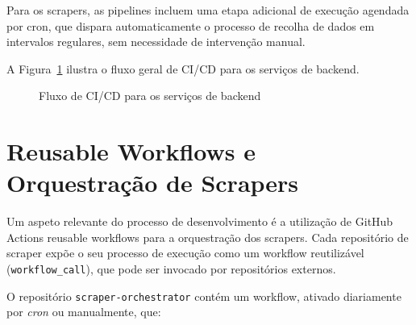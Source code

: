 Para os scrapers, as pipelines incluem uma etapa adicional de execução agendada por cron, que dispara automaticamente o processo de recolha de dados em intervalos regulares, sem necessidade de intervenção manual.

A Figura~\ref{fig:cicd} ilustra o fluxo geral de \ac{CI/CD} para os serviços de backend.

\begin{figure}[H]
\centering
{}
\caption{Fluxo de \ac{CI/CD} para os serviços de backend}
\label{fig:cicd}
\end{figure}

\section{Reusable Workflows e Orquestração de Scrapers}
\label{sec:5.4}

Um aspeto relevante do processo de desenvolvimento é a utilização de GitHub Actions reusable workflows para a orquestração dos scrapers. Cada repositório de scraper expõe o seu processo de execução como um workflow reutilizável (\texttt{workflow\_call}), que pode ser invocado por repositórios externos.

O repositório \texttt{scraper-orchestrator} contém um workflow, ativado diariamente por \textit{cron} ou manualmente, que:

